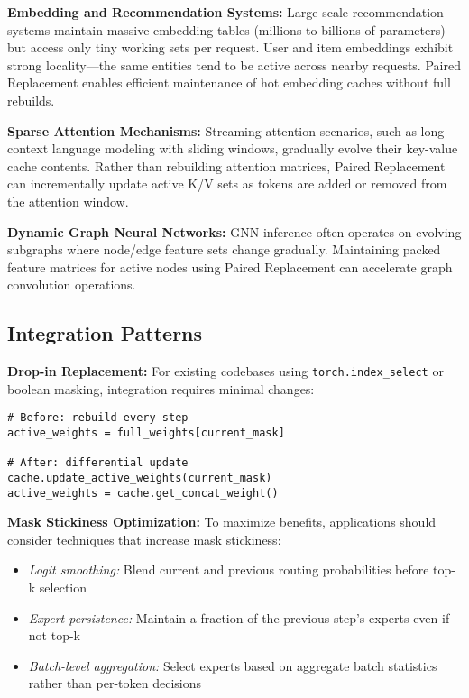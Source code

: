 \documentclass{article}
\numberwithin{equation}{section}
\theoremstyle{plain}
\theoremstyle{definition}
\theoremstyle{remark}
\begin{document}
\textbf{Embedding and Recommendation Systems:} Large-scale recommendation systems maintain massive embedding tables (millions to billions of parameters) but access only tiny working sets per request. User and item embeddings exhibit strong locality—the same entities tend to be active across nearby requests. Paired Replacement enables efficient maintenance of hot embedding caches without full rebuilds.

\textbf{Sparse Attention Mechanisms:} Streaming attention scenarios, such as long-context language modeling with sliding windows, gradually evolve their key-value cache contents. Rather than rebuilding attention matrices, Paired Replacement can incrementally update active K/V sets as tokens are added or removed from the attention window.

\textbf{Dynamic Graph Neural Networks:} GNN inference often operates on evolving subgraphs where node/edge feature sets change gradually. Maintaining packed feature matrices for active nodes using Paired Replacement can accelerate graph convolution operations.

\subsection{Integration Patterns}

\textbf{Drop-in Replacement:} For existing codebases using \texttt{torch.index\_select} or boolean masking, integration requires minimal changes:
\begin{verbatim}
# Before: rebuild every step
active_weights = full_weights[current_mask]

# After: differential update
cache.update_active_weights(current_mask)
active_weights = cache.get_concat_weight()
\end{verbatim}

\textbf{Mask Stickiness Optimization:} To maximize benefits, applications should consider techniques that increase mask stickiness:
\begin{itemize}
    \item \emph{Logit smoothing:} Blend current and previous routing probabilities before top-k selection
    \item \emph{Expert persistence:} Maintain a fraction of the previous step's experts even if not top-k
    \item \emph{Batch-level aggregation:} Select experts based on aggregate batch statistics rather than per-token decisions
\end{itemize}
\end{document}
